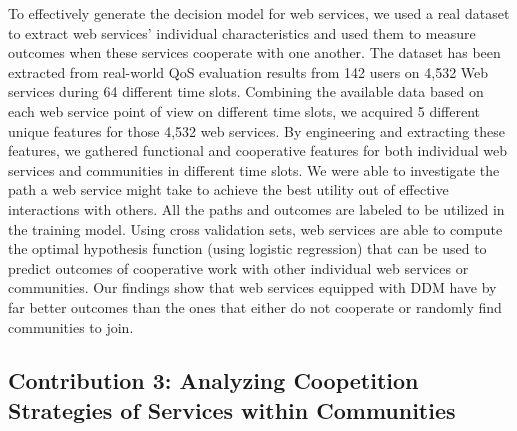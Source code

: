 To effectively generate the decision model for web services, we used a real dataset to extract web services' individual characteristics and used them to measure outcomes when these services cooperate with one another. The dataset has been extracted from real-world QoS evaluation results from 142 users on 4,532 Web services during 64 different time slots. Combining the available data based on each web service point of view on different time slots, we acquired 5 different unique features for those 4,532 web services. By engineering and extracting these features, we gathered functional and cooperative features for both individual web services and communities in different time slots. We were able to investigate the path a web service might take to achieve the best utility out of effective interactions with others. All the paths and outcomes are labeled to be utilized in the training model. Using cross validation sets, web services are able to compute the optimal hypothesis function (using logistic regression) that can be used to predict outcomes of cooperative work with other individual web services or communities. Our findings show that web services equipped with DDM have by far better outcomes than the ones that either do not cooperate or randomly find communities to join.


\subsection{Contribution 3: Analyzing Coopetition Strategies of Services within Communities}

